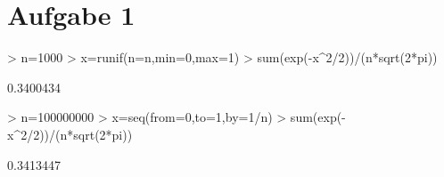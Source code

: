 

\section{Aufgabe 1}

\begin{Schunk}
\begin{Sinput}
> n=1000
> x=runif(n=n,min=0,max=1)
> sum(exp(-x^2/2))/(n*sqrt(2*pi))
\end{Sinput}
\begin{Soutput}
[1] 0.3400434
\end{Soutput}
\end{Schunk}

\begin{Schunk}
\begin{Sinput}
> n=100000000
> x=seq(from=0,to=1,by=1/n)
> sum(exp(-x^2/2))/(n*sqrt(2*pi))
\end{Sinput}
\begin{Soutput}
[1] 0.3413447
\end{Soutput}
\end{Schunk}
